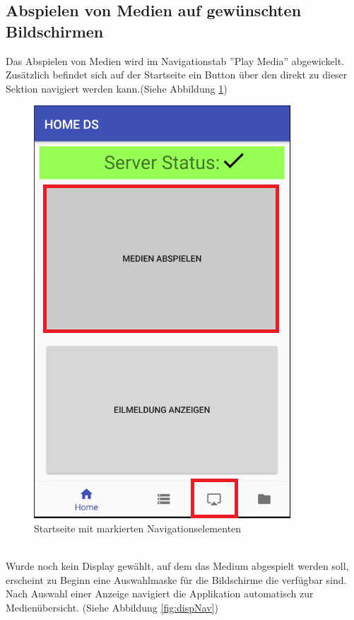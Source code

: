 \subsection{Abspielen von Medien auf gewünschten Bildschirmen}
Das Abspielen von Medien wird im Navigationstab ''Play Media'' abgewickelt. Zusätzlich befindet sich auf der Startseite ein Button über den direkt zu dieser Sektion navigiert werden kann.(Siehe Abbildung \ref{fig:mediaNav})
\\
\begin{figure}[H]
\centering
\includegraphics[scale=0.35]{images/06_AndroidApp/06_mediaNavigation}
\caption{Startseite mit markierten Navigationselementen}
\label{fig:mediaNav}
\end{figure}
\\
Wurde noch kein Display gewählt, auf dem das Medium abgespielt werden soll, erscheint zu Beginn eine Auswahlmaske für die Bildschirme die verfügbar sind. Nach Auswahl einer Anzeige navigiert die Applikation automatisch zur Medienübersicht. (Siehe Abbildung \ref{fig:dispNav})
\\
